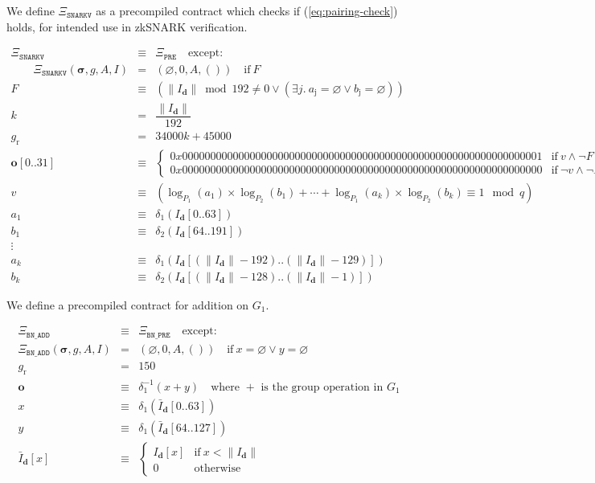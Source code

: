 \documentclass[9pt,oneside]{amsart}
\begin{document}
We define $\Xi_{\mathtt{SNARKV}}$ as a precompiled contract which checks if (\ref{eq:pairing-check}) holds, for intended use in zkSNARK verification.

\begin{eqnarray}
\Xi_{\mathtt{SNARKV}}&\equiv&\Xi_{\mathtt{PRE}}\quad\text{except:}\\
\qquad\Xi_{\mathtt{SNARKV}}(\boldsymbol\sigma,g,A,I)&=&\left(\varnothing,0,A,()\right)\quad\text{if}\ F\\
F&\equiv&(\lVert I_{\mathbf{d}} \rVert\bmod 192\neq 0\vee(\exists j.\ a_{\mathrm{j}}=\varnothing\vee b_{\mathrm{j}}=\varnothing))\\
k &=& \dfrac{\lVert I_{\mathbf{d}} \rVert}{192} \\
g_{\mathrm{r}}&=& 34000k + 45000 \\
\mathbf{o}[0..31]&\equiv&\begin{cases}
0x0000000000000000000000000000000000000000000000000000000000000001&\text{if}\ v\wedge\neg F\\
0x0000000000000000000000000000000000000000000000000000000000000000&\text{if}\ \neg v\wedge\neg F
\end{cases}\\
v&\equiv&(\log_{P_1}(a_1)\times\log_{P_2}(b_1)+\cdots+\log_{P_1}(a_k)\times\log_{P_2}(b_k)\equiv 1\mod q)\\
a_1&\equiv&\delta_1(I_{\mathbf{d}}[0..63])\\
b_1&\equiv&\delta_2(I_{\mathbf{d}}[64..191])\\\nonumber
\vdots\\
a_k&\equiv&\delta_1(I_{\mathbf{d}}[(\lVert I_{\mathbf{d}} \rVert-192)..(\lVert I_{\mathbf{d}} \rVert-129)])\\
b_k&\equiv&\delta_2(I_{\mathbf{d}}[(\lVert I_{\mathbf{d}} \rVert-128)..(\lVert I_{\mathbf{d}} \rVert-1)])
\end{eqnarray}

We define a precompiled contract for addition on $G_1$.

\begin{eqnarray}
\Xi_{\mathtt{BN\_ADD}}&\equiv&\Xi_{\mathtt{BN\_PRE}}\quad\text{except:}\\
\Xi_{\mathtt{BN\_ADD}}(\boldsymbol\sigma,g,A,I)&=&\left(\varnothing,0,A,()\right)\quad\text{if}\ x=\varnothing\vee y=\varnothing\\
g_{\mathrm{r}} &=& 150\\
\mathbf{o}&\equiv&\delta_1^{-1}(x+y)\quad\text{where $+$ is the group operation in $G_1$}\\
x&\equiv&\delta_1\left(\bar I_{\mathbf{d}}[0..63]\right)\\
y&\equiv&\delta_1\left(\bar I_{\mathbf{d}}[64..127]\right)\\
\label{eq:complemented_input}\bar I_{\mathbf{d}}[x]&\equiv&\begin{cases}
I_{\mathbf{d}}[x]&\text{if}\ x < \lVert I_{\mathbf{d}} \rVert\\
0&\text{otherwise}
\end{cases}
\end{eqnarray}
\end{document}
